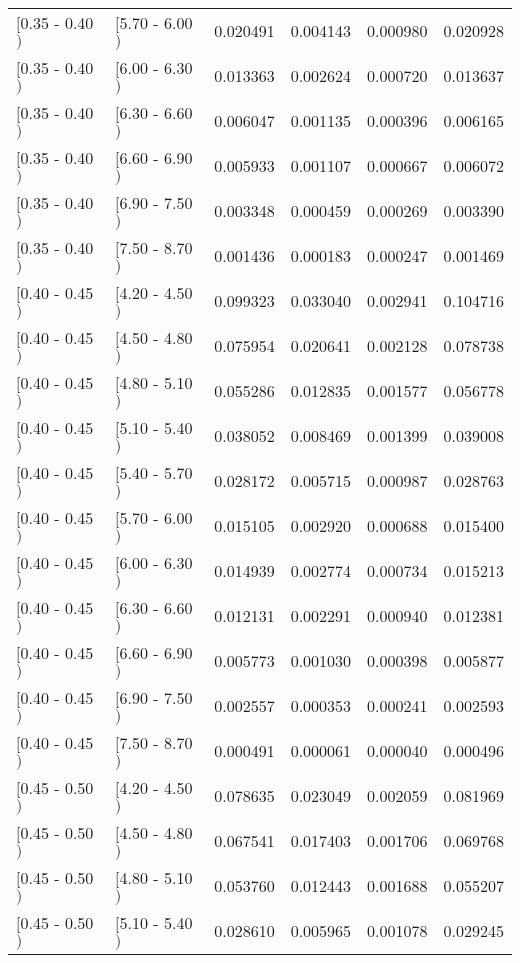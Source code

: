 \begin{longtable}{| l | l | r | r | r | r |}
$[$0.35 - 0.40$)$ & $[$5.70 - 6.00$)$ & 0.020491 & 0.004143 & 0.000980 & 0.020928 \\
$[$0.35 - 0.40$)$ & $[$6.00 - 6.30$)$ & 0.013363 & 0.002624 & 0.000720 & 0.013637 \\
$[$0.35 - 0.40$)$ & $[$6.30 - 6.60$)$ & 0.006047 & 0.001135 & 0.000396 & 0.006165 \\
$[$0.35 - 0.40$)$ & $[$6.60 - 6.90$)$ & 0.005933 & 0.001107 & 0.000667 & 0.006072 \\
$[$0.35 - 0.40$)$ & $[$6.90 - 7.50$)$ & 0.003348 & 0.000459 & 0.000269 & 0.003390 \\
$[$0.35 - 0.40$)$ & $[$7.50 - 8.70$)$ & 0.001436 & 0.000183 & 0.000247 & 0.001469 \\
$[$0.40 - 0.45$)$ & $[$4.20 - 4.50$)$ & 0.099323 & 0.033040 & 0.002941 & 0.104716 \\
$[$0.40 - 0.45$)$ & $[$4.50 - 4.80$)$ & 0.075954 & 0.020641 & 0.002128 & 0.078738 \\
$[$0.40 - 0.45$)$ & $[$4.80 - 5.10$)$ & 0.055286 & 0.012835 & 0.001577 & 0.056778 \\
$[$0.40 - 0.45$)$ & $[$5.10 - 5.40$)$ & 0.038052 & 0.008469 & 0.001399 & 0.039008 \\
$[$0.40 - 0.45$)$ & $[$5.40 - 5.70$)$ & 0.028172 & 0.005715 & 0.000987 & 0.028763 \\
$[$0.40 - 0.45$)$ & $[$5.70 - 6.00$)$ & 0.015105 & 0.002920 & 0.000688 & 0.015400 \\
$[$0.40 - 0.45$)$ & $[$6.00 - 6.30$)$ & 0.014939 & 0.002774 & 0.000734 & 0.015213 \\
$[$0.40 - 0.45$)$ & $[$6.30 - 6.60$)$ & 0.012131 & 0.002291 & 0.000940 & 0.012381 \\
$[$0.40 - 0.45$)$ & $[$6.60 - 6.90$)$ & 0.005773 & 0.001030 & 0.000398 & 0.005877 \\
$[$0.40 - 0.45$)$ & $[$6.90 - 7.50$)$ & 0.002557 & 0.000353 & 0.000241 & 0.002593 \\
$[$0.40 - 0.45$)$ & $[$7.50 - 8.70$)$ & 0.000491 & 0.000061 & 0.000040 & 0.000496 \\
$[$0.45 - 0.50$)$ & $[$4.20 - 4.50$)$ & 0.078635 & 0.023049 & 0.002059 & 0.081969 \\
$[$0.45 - 0.50$)$ & $[$4.50 - 4.80$)$ & 0.067541 & 0.017403 & 0.001706 & 0.069768 \\
$[$0.45 - 0.50$)$ & $[$4.80 - 5.10$)$ & 0.053760 & 0.012443 & 0.001688 & 0.055207 \\
$[$0.45 - 0.50$)$ & $[$5.10 - 5.40$)$ & 0.028610 & 0.005965 & 0.001078 & 0.029245 \\

\end{longtable}
